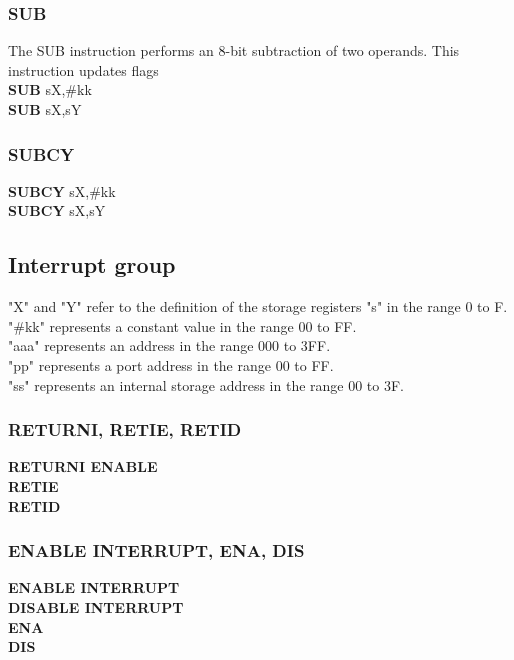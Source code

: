         \subsubsection{SUB}
            The SUB instruction performs an 8-bit subtraction of two operands. This instruction updates flags\\
            \textbf{SUB} sX,\#kk\\
            \textbf{SUB} sX,sY\\

        \subsubsection{SUBCY}
            \textbf{SUBCY} sX,\#kk\\
            \textbf{SUBCY} sX,sY\\

        \subsection{Interrupt group}
            "X" and "Y" refer to the definition of the storage registers "s" in the range 0 to F.\\
            "\#kk" represents a constant value in the range 00 to FF.\\
            "aaa" represents an address in the range 000 to 3FF.\\
            "pp" represents a port address in the range 00 to FF.\\
            "ss" represents an internal storage address in the range 00 to 3F.\\

        \subsubsection{RETURNI, RETIE, RETID}
            \textbf{RETURNI ENABLE}\\
            \textbf{RETIE}\\
            \textbf{RETID}\\

        \subsubsection{ENABLE INTERRUPT, ENA, DIS}
            \textbf{ENABLE INTERRUPT}\\
            \textbf{DISABLE INTERRUPT}\\
            \textbf{ENA}\\
            \textbf{DIS}\\


